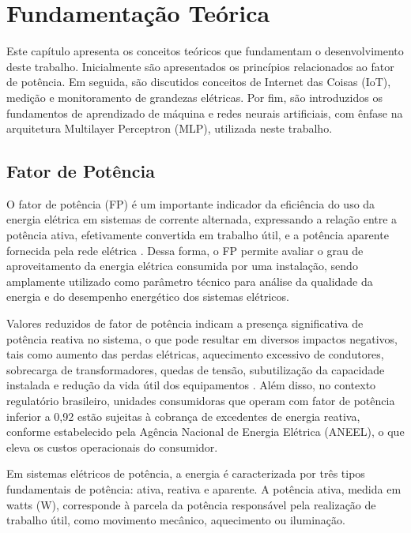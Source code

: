 \chapter{Fundamentação Teórica} \label{Fundamentação Teórica}

Este capítulo apresenta os conceitos teóricos que fundamentam o desenvolvimento deste trabalho. Inicialmente são apresentados os princípios relacionados ao fator de potência. Em seguida, são discutidos conceitos de Internet das Coisas (IoT), medição e monitoramento de grandezas elétricas. Por fim, são introduzidos os fundamentos de aprendizado de máquina e redes neurais artificiais, com ênfase na arquitetura Multilayer Perceptron (MLP), utilizada neste trabalho.

\section{Fator de Potência}
O fator de potência (FP) é um importante indicador da eficiência do uso da energia elétrica em sistemas de corrente alternada, expressando a relação entre a potência ativa, efetivamente convertida em trabalho útil, e a potência aparente fornecida pela rede elétrica \cite{Stevenson1994, Glover2012}. Dessa forma, o FP permite avaliar o grau de aproveitamento da energia elétrica consumida por uma instalação, sendo amplamente utilizado como parâmetro técnico para análise da qualidade da energia e do desempenho energético dos sistemas elétricos.

Valores reduzidos de fator de potência indicam a presença significativa de potência reativa no sistema, o que pode resultar em diversos impactos negativos, tais como aumento das perdas elétricas, aquecimento excessivo de condutores, sobrecarga de transformadores, quedas de tensão, subutilização da capacidade instalada e redução da vida útil dos equipamentos \cite{Pansini2011, Mamede2018}. Além disso, no contexto regulatório brasileiro, unidades consumidoras que operam com fator de potência inferior a 0,92 estão sujeitas à cobrança de excedentes de energia reativa, conforme estabelecido pela Agência Nacional de Energia Elétrica (ANEEL), o que eleva os custos operacionais do consumidor.

Em sistemas elétricos de potência, a energia é caracterizada por três tipos fundamentais de potência: ativa, reativa e aparente. A potência ativa, medida em watts (W), corresponde à parcela da potência responsável pela realização de trabalho útil, como movimento mecânico, aquecimento ou iluminação. 

